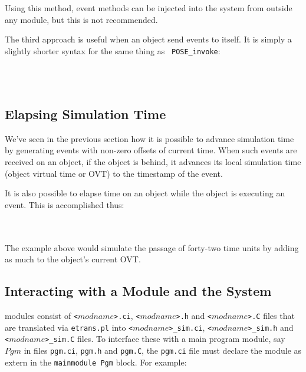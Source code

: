 Using this method, event methods can be injected into the system from
outside any module, but this is not recommended.

The third approach is useful when an object send events to itself.  It
is simply a slightly shorter syntax for the same thing as {\tt
POSE\_invoke}: 

~\\
\\

\subsection{Elapsing Simulation Time}

We've seen in the previous section how it is possible to advance
simulation time by generating events with non-zero offsets of current
time.  When such events are received on an object, if the object is
behind, it advances its local simulation time (object virtual time or
OVT) to the timestamp of the event.

It is also possible to elapse time on an object while the object is
executing an event.  This is accomplished thus:

~\\
\\

The example above would simulate the passage of forty-two time units
by adding as much to the object's current OVT.

\subsection{Interacting with a \pose{} Module and the \pose{} System}

\pose{} modules consist of {\tt <$modname$>.ci}, {\tt <$modname$>.h}
and {\tt <$modname$>.C} files that are translated via {\tt etrans.pl}
into {\tt <$modname$>\_sim.ci}, {\tt <$modname$>\_sim.h} and {\tt
<$modname$>\_sim.C} files.  To interface these with a main program
module, say $Pgm$ in files {\tt pgm.ci}, {\tt pgm.h} and {\tt pgm.C},
the {\tt pgm.ci} file must declare the \pose{} module as extern in the
{\tt mainmodule Pgm} block. For example:

~\\
\\

